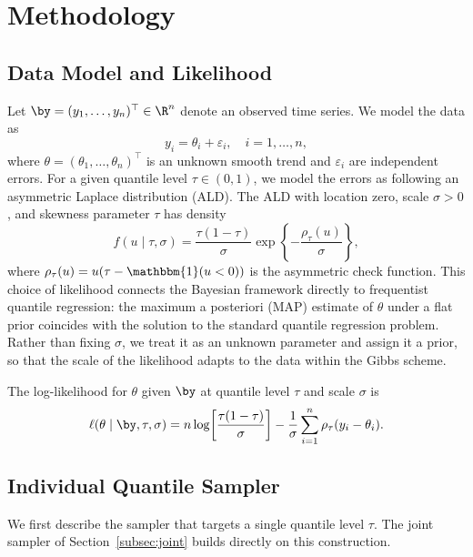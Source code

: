 \section{Methodology}
\label{sec:methodology}

\subsection{Data Model and Likelihood}
\label{subsec:model}

Let $\by = (y_1, \ldots, y_n)^\top \in \R^n$ denote an observed time series. We model the data as
\begin{equation}
    y_i = \theta_i + \varepsilon_i, \quad i = 1, \ldots, n,
    \label{eq:datamodel}
\end{equation}
where $\theta = (\theta_1, \ldots, \theta_n)^\top$ is an unknown smooth trend and $\varepsilon_i$ are independent errors. For a given quantile level $\tau \in (0,1)$, we model the errors as following an asymmetric Laplace distribution (ALD). The ALD with location zero, scale $\sigma > 0$, and skewness parameter $\tau$ has density
\begin{equation}
    f(u \mid \tau, \sigma) = \frac{\tau(1-\tau)}{\sigma}
    \exp\!\left\{-\frac{\rho_\tau(u)}{\sigma}\right\},
    \label{eq:ald}
\end{equation}
where $\rho_\tau(u) = u(\tau - \mathbbm{1}(u < 0))$ is the asymmetric check function. This choice of likelihood connects the Bayesian framework directly to frequentist quantile regression: the maximum a posteriori (MAP) estimate of $\theta$ under a flat prior coincides with the solution to the standard quantile regression problem. Rather than fixing $\sigma$, we treat it as an unknown parameter and assign it a prior, so that the scale of the likelihood adapts to the data within the Gibbs scheme.

The log-likelihood for $\theta$ given $\by$ at quantile level $\tau$ and scale $\sigma$ is
\begin{align*}
    \ell(\theta \mid \by, \tau, \sigma)
    = n \log\!\left[\frac{\tau(1-\tau)}{\sigma}\right]
    - \frac{1}{\sigma}\sum_{i=1}^n \rho_\tau(y_i - \theta_i).
\end{align*}

\subsection{Individual Quantile Sampler}
\label{subsec:individual}

We first describe the sampler that targets a single quantile level $\tau$. The joint sampler of Section~\ref{subsec:joint} builds directly on this construction.

